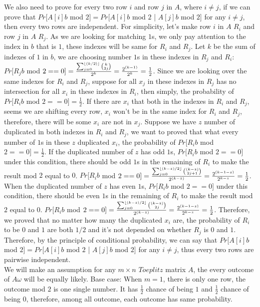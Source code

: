 \documentclass[11pt]{article}
\begin{document}
\begin{solution}
\begin{enumerate}[(a)]
    We also need to prove for every two row $i$ and row $j$ in $A$, where $i \neq j$, if we can prove that $Pr[A[i]b$ mod $2] = Pr[A[i]b$ mod $2$ | $A[j]b$ mod $2]$ for any $i \neq j$, then every two rows are independent. For simplicity, let's make row $i$ in $A$ $R_i$ and row $j$ in $A$ $R_j$. As we are looking for matching $1$s, we only pay attention to the index in $b$ that is $1$, these indexes will be same for $R_i$ and $R_j$. 
    Let $k$ be the sum of indexes of $1$ in $b$, we are choosing number $1$s in these indexes in $R_j$ and $R_i$:
    $Pr[R_jb$ mod $2 == 0] = \frac {\sum_{j=0}^{\lfloor (k/2) \rfloor}{k\choose 2j }}{2^k} = \frac{2^{(k-1)}}{2^k} = \frac{1}{2}$. Since we are looking over the same indexes for $R_i$ and $R_j$, suppose for all $x_j$ in these indexes in $R_j$ has no intersection for all $x_i$ in these indexes in $R_i$, then simply, the probability of $Pr[R_ib$ mod $2 == 0] = \frac{1}{2}$. If there are $x_i$ that both in the indexes in $R_i$ and $R_j$, seems we are shifting every row, $x_i$ won't be in the same index for $R_i$ and $R_j$, therefore, there will be some $x_i$ are not in $x_j$. Suppose we have $z$ number of duplicated in both indexes in $R_i$ and $R_j$, we want to proved that what every number of $1$s in these $z$ duplicated $x_i$, the probability of $Pr[R_ib$ mod $2 == 0] = \frac{1}{2}$. If the duplicated number of $z$ has odd $1$s, $Pr[R_ib$ mod $2 == 0]$ under this condition, there should be odd $1$s in the remaining of $R_i$ to make the result mod $2$ equal to $0$. $Pr[R_ib$ mod $2 == 0] = \frac {\sum_{j=0}^{\lfloor (k-z)/2 \rfloor}{(k-z)\choose 2j+1 }}{2^{(k-z)}} = \frac{2^{(k-1-z)}}{2^{k-z}} = \frac{1}{2}$. When the duplicated number of $z$ has even $1$s, $Pr[R_ib$ mod $2 == 0]$ under this condition, there should be even $1$s in the remaining of $R_i$ to make the result mod $2$ equal to $0$. $Pr[R_ib$ mod $2 == 0] = \frac {\sum_{j=0}^{\lfloor (k-z)/2 \rfloor}{(k-z)\choose 2j }}{2^{(k-z)}} = \frac{2^{(k-1-z)}}{2^{k-z}} = \frac{1}{2}$. Therefore, we proved that no matter how many the duplicated $x_i$ are, the probability of $R_i$ to be $0$ and $1$ are both $1/2$ and it's not depended on whether $R_j$ is $0$ and $1$. Therefore, by the principle of conditional probability, we can say that $Pr[A[i]b$ mod $2] = Pr[A[i]b$ mod $2$ | $A[j]b$ mod $2]$ for any $i \neq j$, thus every two rows are pairwise independent. 
    $$$$
    We will make an assumption for any $m \times n$ $Toeplitz$ matrix $A$, the every outcome of $A\omega$ will be equally likely.
    \newline
    Base case: When $m = 1$, there is only one row, the outcome mod $2$ is one single number. It has $\frac{1}{2}$ chance of being $1$ and $\frac{1}{2}$ chance of being $0$, therefore, among all outcome, each outcome has same probability.

\end{enumerate}
\end{solution}
\end{document}
